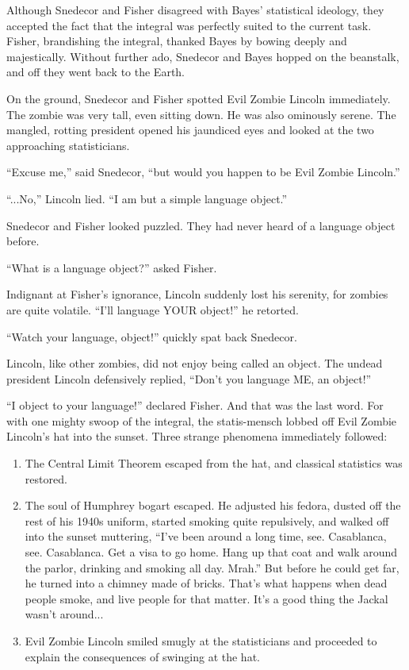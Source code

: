 \documentclass{article}
\begin{document}
Although Snedecor and Fisher disagreed with Bayes' statistical ideology, they accepted the fact that the integral was perfectly suited to the current task. Fisher, brandishing the integral, thanked Bayes by bowing deeply and majestically. Without further ado, Snedecor and Bayes hopped on the beanstalk, and off they went back to the Earth.  


On the ground, Snedecor and Fisher spotted Evil Zombie Lincoln immediately. The zombie was very tall, even sitting down. He was also ominously serene. The mangled, rotting president opened his jaundiced eyes and looked at the two approaching statisticians. 

``Excuse me,'' said Snedecor, ``but would you happen to be Evil Zombie Lincoln.'' 

``...No,'' Lincoln lied. ``I am but a simple language object.'' 

Snedecor and Fisher looked puzzled. They had never heard of a language object before. 

``What is a language object?'' asked Fisher. 

Indignant at Fisher's ignorance, Lincoln suddenly lost his serenity, for zombies are quite volatile. ``I'll language YOUR object!'' he retorted. 

``Watch your language, object!'' quickly spat back Snedecor. 

Lincoln, like other zombies, did not enjoy being called an object. The undead president Lincoln defensively replied, ``Don't you language ME, an object!'' 

``I object to your language!'' declared Fisher. And that was the last word. For with one mighty swoop of the integral, the statis-mensch lobbed off Evil Zombie Lincoln's hat into the sunset. Three strange phenomena immediately followed: 

\begin{enumerate}
\item The Central Limit Theorem escaped from the hat, and classical statistics was restored.
\item The soul of Humphrey bogart escaped. He adjusted his fedora, dusted off the rest of his 1940s uniform, started smoking quite repulsively, and walked off into the sunset muttering, ``I've been around a long time, see. Casablanca, see. Casablanca. Get a visa to go home. Hang up that coat and walk around the parlor, drinking and smoking all day. Mrah.'' But before he could get far, he turned into a chimney made of bricks. That's what happens when dead people smoke, and live people for that matter. It's a good thing the Jackal wasn't around...
\item Evil Zombie Lincoln smiled smugly at the statisticians and proceeded to explain the consequences of swinging at the hat.
\end{enumerate}
\end{document}
